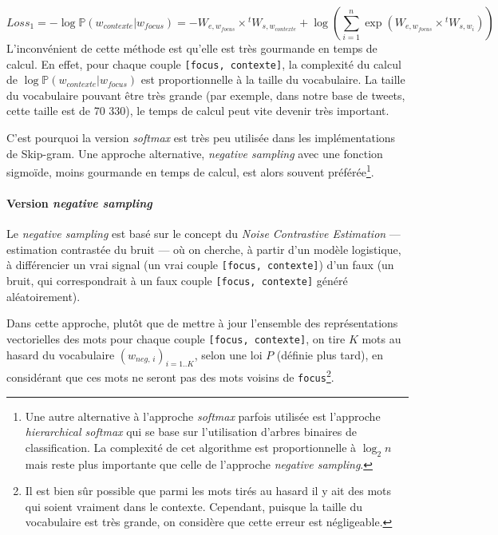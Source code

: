 \documentclass[11pt,french,french]{article}
\let\rmarkdownfootnote\footnote%
\def\footnote{\protect\rmarkdownfootnote}
\begin{document}
\[
Loss_{1}=-\log\mathbb P(w_{contexte}\vert w_{focus}) =
-W_{e,w_{focus}}\times {}^tW_{s,w_{contexte}}+
\log\left(\sum_{i=1}^n\exp(W_{e,w_{focus}}\times {}^t W_{s,w_i})\right)
\]
L'inconvénient de cette méthode est qu'elle est très gourmande en temps de calcul.
En effet, pour chaque couple \texttt{{[}focus,\ contexte{]}}, la complexité du calcul de \(\log\mathbb P(w_{contexte}\vert w_{focus})\) est proportionnelle à la taille du vocabulaire.
La taille du vocabulaire pouvant être très grande (par exemple, dans notre base de tweets, cette taille est de 70 330), le temps de calcul peut vite devenir très important.

C'est pourquoi la version \emph{softmax} est très peu utilisée dans les implémentations de Skip-gram. Une approche alternative, \emph{negative sampling} avec une fonction sigmoïde, moins gourmande en temps de calcul, est alors souvent préférée\footnote{Une autre alternative à l'approche \emph{softmax} parfois utilisée est l'approche \emph{hierarchical softmax} qui se base sur l'utilisation d'arbres binaires de classification. La complexité de cet algorithme est proportionnelle à \(\log_2n\) mais reste plus importante que celle de l'approche \emph{negative sampling}.}.

\hypertarget{subsec:negsampling}{%
\paragraph{\texorpdfstring{Version \emph{negative sampling}}{Version negative sampling}}\label{subsec:negsampling}}

Le \emph{negative sampling} est basé sur le concept du \emph{Noise Contrastive Estimation} --- estimation contrastée du bruit --- où on cherche, à partir d'un modèle logistique, à différencier un vrai signal (un vrai couple \texttt{{[}focus,\ contexte{]}}) d'un faux (un bruit, qui correspondrait à un faux couple \texttt{{[}focus,\ contexte{]}} généré aléatoirement).

Dans cette approche, plutôt que de mettre à jour l'ensemble des représentations vectorielles des mots pour chaque couple \texttt{{[}focus,\ contexte{]}}, on tire \(K\) mots au hasard du vocabulaire \((w_{neg,\,i})_{i=1..K}\), selon une loi \(P\) (définie plus tard), en considérant que ces mots ne seront pas des mots voisins de \texttt{focus}\footnote{Il est bien sûr possible que parmi les mots tirés au hasard il y ait des mots qui soient vraiment dans le contexte.
  Cependant, puisque la taille du vocabulaire est très grande, on considère que cette erreur est négligeable.}.
\end{document}
